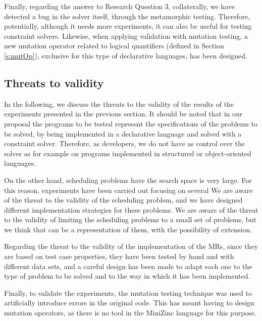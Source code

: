 Finally, regarding the answer to Research Question 3, collaterally,
we have detected a bug in the solver itself, through the metamorphic testing.
Therefore, potentially, although it needs more experiments,
it can also be useful
for testing constraint solvers. Likewise, when applying validation with
mutation testing, a new mutation operator related to logical
quantifiers (defined in Section \ref{s:mutOp}), exclusive for this type of
declarative languages, has been designed.
\subsection{Threats to validity}
In the following, we discuss the threats to the validity of the results of the
experiments presented in the previous section.
It should be noted that in our proposal the programs to be tested
represent the specifications of the problems to be solved, by being
implemented in a declarative language and solved with a constraint solver.
Therefore, as developers, we do not have as control over the solver
as for example on programs implemented in structured
or object-oriented languages.

On the other hand, scheduling problems have the search space is very large. 
For this reason, experiments have
been carried out focusing on several We are aware of the threat
to the validity of the scheduling problem, and we have designed
different implementation strategies for these problems.
We are aware of the threat to the validity of limiting
the scheduling problems to a small set of problems, but we think that
can be a representation of them, with the possibility of extension.

Regarding the threat to the validity of the implementation of the MRs,
since they are based on test case properties, they have been tested by hand
and with different data sets,  and a careful design has been made to
adapt each one to the type of problem to be solved and to the way in
which it has been implemented.

Finally, to validate the experiments, the mutation testing technique
was used to artificially introduce errors in the original code.
This has meant having to design mutation operators, as there is no
tool in the MiniZinc language for this purpose.



